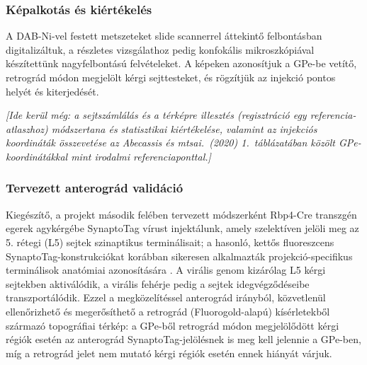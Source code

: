 \subsubsection{Képalkotás és kiértékelés}

A DAB-Ni-vel festett metszeteket slide scannerrel áttekintő felbontásban
digitalizáltuk, a részletes vizsgálathoz pedig konfokális mikroszkópiával
készítettünk nagyfelbontású felvételeket. A képeken azonosítjuk a GPe-be
vetítő, retrográd módon megjelölt kérgi sejttesteket, és rögzítjük az
injekció pontos helyét és kiterjedését.

\emph{[Ide kerül még: a sejtszámlálás és a térképre illesztés (regisztráció
egy referencia-atlaszhoz) módszertana és statisztikai kiértékelése, valamint
az injekciós koordináták összevetése az Abecassis és mtsai.\ (2020)
1.~táblázatában közölt GPe-koordinátákkal mint irodalmi referenciaponttal.]}

\subsubsection{Tervezett anterográd validáció}

Kiegészítő, a projekt második felében tervezett módszerként Rbp4-Cre
transzgén egerek agykérgébe SynaptoTag vírust injektálunk, amely szelektíven
jelöli meg az 5. rétegi (L5) sejtek szinaptikus terminálisait; a hasonló,
kettős fluoreszcens SynaptoTag-konstrukciókat korábban sikeresen alkalmazták
projekció-specifikus terminálisok anatómiai azonosítására \cite{xia2020}.
A virális genom kizárólag L5 kérgi sejtekben aktiválódik, a virális fehérje
pedig a sejtek idegvégződéseibe transzportálódik. Ezzel a megközelítéssel
anterográd irányból, közvetlenül ellenőrizhető és megerősíthető a retrográd
(Fluorogold-alapú) kísérletekből származó topográfiai térkép: a GPe-ből
retrográd módon megjelölődött kérgi régiók esetén az anterográd
SynaptoTag-jelölésnek is meg kell jelennie a GPe-ben, míg a retrográd jelet
nem mutató kérgi régiók esetén ennek hiányát várjuk.
